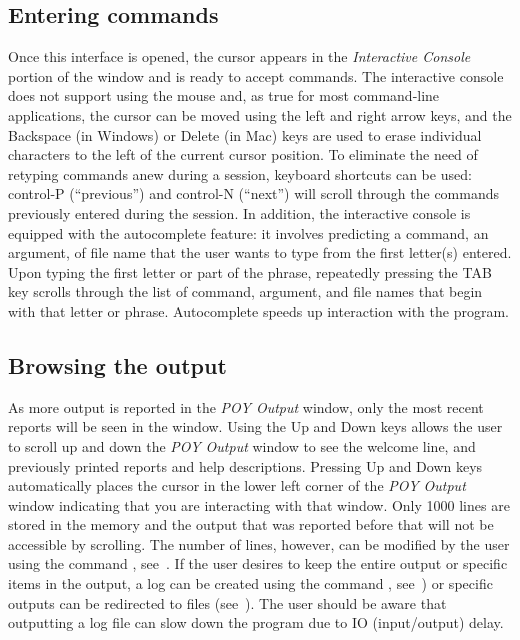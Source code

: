{\subsection{Entering commands}
Once this \poy interface is opened, the cursor appears in the \emph{Interactive Console} portion of the window and is ready to accept commands. The interactive console does not support using the mouse and, as true for most command-line applications, the cursor can be moved using the left and right arrow keys, and the Backspace (in Windows) or Delete (in Mac) keys are used to erase individual characters to the left of the current cursor position. To eliminate the need of retyping commands anew during a \poy session, keyboard shortcuts can be used: control-P (``previous'') and control-N (``next'') will scroll through the commands previously entered during the session. In addition, the interactive console is equipped with the autocomplete feature: it involves \poy predicting a command, an argument, of file name that the user wants to type from the first letter(s) entered. Upon typing the first letter or part of the phrase, repeatedly pressing the TAB key scrolls through the list of command, argument, and file names that begin with that letter or phrase. Autocomplete speeds up interaction with the program.

\subsection{Browsing the output}
As more output is reported in the \emph{POY Output} window, only the most recent reports will be seen in the window. Using the Up and Down keys allows the user to scroll up and down the \emph{POY Output} window to see the welcome line, and previously printed reports and help descriptions. Pressing Up and Down keys automatically places the cursor in the lower left corner of the \emph{POY Output} window indicating that you are interacting with that window. Only 1000 lines are stored in the memory and the output that was reported before that will not be accessible by scrolling. The number of lines, however, can be modified by the user using the command , see~. If the user desires to keep the entire output or specific items in the output, a log can be created using the command , see~) or specific outputs can be redirected to files (see~).  The user should be aware that outputting a log file can slow down the program due to IO (input/output) delay.

}

